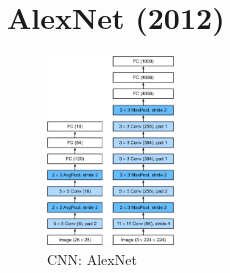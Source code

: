 \section{AlexNet (2012) \cite{gfg-convolutional-neural-network-cnn-in-machine-learning, medium/@siddheshb008/alexnet-architecture-explained-b6240c528bd5,wiki-AlexNet,dnn-1}} \label{cnn: AlexNet}

\begin{figure}[H]
    \centering
    \includegraphics[width=\linewidth, height=5cm, keepaspectratio]{Pictures/convolutional-neural-network/alexnet.jpg}
    \caption*{CNN: AlexNet \cite{dnn-1}}
\end{figure}

